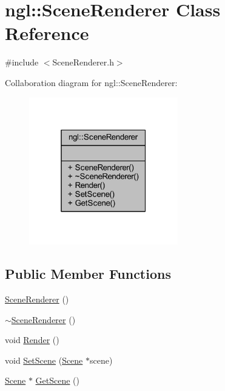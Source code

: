 \hypertarget{classngl_1_1_scene_renderer}{}\section{ngl\+:\+:Scene\+Renderer Class Reference}
\label{classngl_1_1_scene_renderer}


{\ttfamily \#include $<$Scene\+Renderer.\+h$>$}



Collaboration diagram for ngl\+:\+:Scene\+Renderer\+:
\nopagebreak
\begin{figure}[H]
\begin{center}
\leavevmode
\includegraphics[width=184pt]{classngl_1_1_scene_renderer__coll__graph}
\end{center}
\end{figure}
\subsection*{Public Member Functions}
\begin{DoxyCompactItemize}
\item 
\mbox{\hyperlink{classngl_1_1_scene_renderer_af054b535cfc68c1a2452e2d1317a465d}{Scene\+Renderer}} ()
\item 
\mbox{\hyperlink{classngl_1_1_scene_renderer_a1d627199b813380f9b6c299d9deec41a}{$\sim$\+Scene\+Renderer}} ()
\item 
void \mbox{\hyperlink{classngl_1_1_scene_renderer_ae6760a1098aafbd318a4c57eb41062dc}{Render}} ()
\item 
void \mbox{\hyperlink{classngl_1_1_scene_renderer_a83e70c0cff7552de9142f4905f442855}{Set\+Scene}} (\mbox{\hyperlink{classngl_1_1_scene}{Scene}} $\ast$scene)
\item 
\mbox{\hyperlink{classngl_1_1_scene}{Scene}} $\ast$ \mbox{\hyperlink{classngl_1_1_scene_renderer_a41167b4f9371ccb200a4720a70e53adb}{Get\+Scene}} ()
\end{DoxyCompactItemize}


